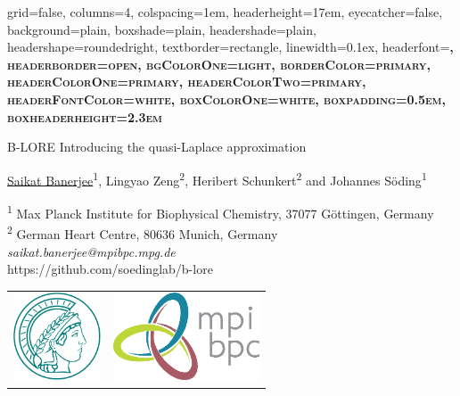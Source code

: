 \documentclass[a0paper,portrait,debug]{baposter}
\begin{document}
\setlength{\belowdisplayskip}{0pt} 
\setlength{\belowdisplayshortskip}{0pt} 
\setlength{\abovedisplayskip}{0pt} 
\setlength{\abovedisplayshortskip}{0pt}


\begin{poster}
{
%
%
	grid=false,
	columns=4,
	colspacing=1em,				%
	headerheight=17em, 				%
	eyecatcher=false,
	background=plain,
  	boxshade=plain,
	headershade=plain,  	
	headershape=roundedright,		%
	textborder=rectangle,			%
	linewidth=0.1ex,				%
	headerfont=\rmfamily\scshape\bfseries\large,
	headerborder=open,
	bgColorOne=light, 
	borderColor=primary,
	headerColorOne=primary,
	headerColorTwo=primary,
	headerFontColor=white,
	boxColorOne=white,
	boxpadding=0.5em,					%
	boxheaderheight=2.3em				%
}
{

}
{
	{\color{primary}B-LORE}
}
{
        Introducing the quasi-Laplace approximation
}
{		
	\underline{Saikat Banerjee}\textsuperscript{1}, Lingyao Zeng\textsuperscript{2}, Heribert Schunkert\textsuperscript{2} and Johannes S\"oding\textsuperscript{1}

}
{
	\textsuperscript{1} Max Planck Institute for Biophysical Chemistry, 37077 G\"ottingen, Germany\\
	\textsuperscript{2} German Heart Centre, 80636 Munich, Germany\\[0.5em]
        {\color{primary} \emph{saikat.banerjee@mpibpc.mpg.de}}\\[0.5em]
        {\color{mpibpcmaroon} https://github.com/soedinglab/b-lore}
}
{
\begin{tabular}{l l}
  \includegraphics[height=7em]{Max-Planck-Gesellschaft-no-txt.pdf} & \includegraphics[height=7em]{Print_Plotter_MPI-BPC_kurz-short_CMYK.eps} \\
\end{tabular}
        
}
\end{poster}
\end{document}
